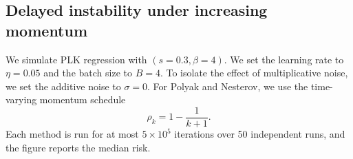 \documentclass[11pt]{article}
\begin{document}



\subsection{Delayed instability under increasing momentum}
\label{app:subsec:blow-up}

We simulate PLK regression  with \((s=0.3,\beta=4)\). We set the learning rate to \(\eta=0.05\) and the batch size to \(B=4\). To isolate the effect of multiplicative noise, we set the additive noise to \(\sigma=0\). For Polyak and Nesterov, we use the time-varying momentum schedule
\[
\rho_k=1-\frac{1}{k+1}.
\]
Each method is run for at most \(5\times10^5\) iterations over 50 independent runs, and the figure reports the median risk. 
\end{document}
